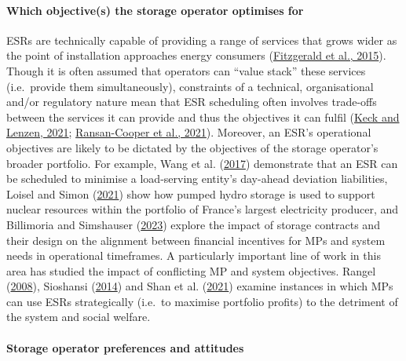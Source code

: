 \documentclass[12pt,a4paper,]{report}
\begin{document}
\hypertarget{which-objectives-the-storage-operator-optimises-for}{%
\paragraph{Which objective(s) the storage operator optimises
for}\label{which-objectives-the-storage-operator-optimises-for}}

ESRs are technically capable of providing a range of services that grows
wider as the point of installation approaches energy consumers
(\protect\hyperlink{ref-fitzgeraldEconomicsBatteryEnergy2015}{Fitzgerald
et al., 2015}). Though it is often assumed that operators can ``value
stack'' these services (i.e.~provide them simultaneously), constraints
of a technical, organisational and/or regulatory nature mean that ESR
scheduling often involves trade-offs between the services it can provide
and thus the objectives it can fulfil
(\protect\hyperlink{ref-keckDriversBenefitsShared2021}{Keck and Lenzen,
2021};
\protect\hyperlink{ref-ransan-cooperApplyingResponsibleAlgorithm2021}{Ransan-Cooper
et al., 2021}). Moreover, an ESR's operational objectives are likely to
be dictated by the objectives of the storage operator's broader
portfolio. For example, Wang et al.
(\protect\hyperlink{ref-wangOptimalSchedulingEnergy2017}{2017})
demonstrate that an ESR can be scheduled to minimise a load-serving
entity's day-ahead deviation liabilities, Loisel and Simon
(\protect\hyperlink{ref-loiselMarketStrategiesLargescale2021}{2021})
show how pumped hydro storage is used to support nuclear resources
within the portfolio of France's largest electricity producer, and
Billimoria and Simshauser
(\protect\hyperlink{ref-billimoriaContractDesignStorage2023a}{2023})
explore the impact of storage contracts and their design on the
alignment between financial incentives for MPs and system needs in
operational timeframes. A particularly important line of work in this
area has studied the impact of conflicting MP and system objectives.
Rangel
(\protect\hyperlink{ref-rangelCompetitionPolicyRegulation2008}{2008}),
Sioshansi (\protect\hyperlink{ref-sioshansiWhenEnergyStorage2014}{2014})
and Shan et al.
(\protect\hyperlink{ref-shanDeleteriousEffectsStrategic2021}{2021})
examine instances in which MPs can use ESRs strategically (i.e.~to
maximise portfolio profits) to the detriment of the system and social
welfare.

\hypertarget{storage-operator-preferences-and-attitudes}{%
\paragraph{Storage operator preferences and
attitudes}\label{storage-operator-preferences-and-attitudes}}
\end{document}
